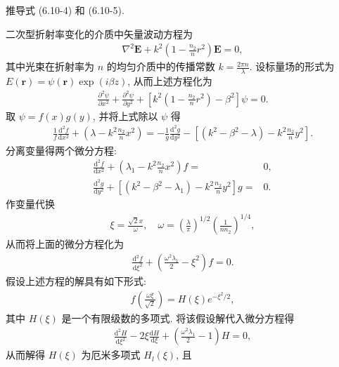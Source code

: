 \documentclass{note}
\begin{document}
\begin{exe}
    推导式 (6.10-4) 和 (6.10-5).
\end{exe}
\begin{pf}
    二次型折射率变化的介质中矢量波动方程为
    \begin{align}
        \nabla^2\bm{E}+k^2\left(1-\frac{n_2}{n}r^2\right)\bm{E}=0,
    \end{align}
    其中光束在折射率为 $n$ 的均匀介质中的传播常数 $k=\frac{2\pi n}{\lambda}$.
    设标量场的形式为 $E(\bm{r})=\psi(\bm{r})\exp(i\beta z)$, 从而上述方程化为
    \begin{align}
        \frac{\partial^2\psi}{\partial x^2}+\frac{\partial^2\psi}{\partial y^2}+\left[k^2\left(1-\frac{n_2}{n}r^2\right)-\beta^2\right]\psi=0.
    \end{align}
    取 $\psi=f(x)g(y)$, 并将上式除以 $\psi$ 得
    \begin{align}
        \frac{1}{f}\frac{\mathrm{d}^2f}{\mathrm{d}x^2}+\left(\lambda-k^2\frac{n_2}{n}x^2\right)=-\frac{1}{g}\frac{\mathrm{d}^2g}{\mathrm{d}y^2}-\left[(k^2-\beta^2-\lambda)-k^2\frac{n_2}{n}y^2\right].
    \end{align}
    分离变量得两个微分方程:
    \begin{align}
        \frac{\mathrm{d}^2f}{\mathrm{d}x^2}+\left(\lambda_1-k^2\frac{n_2}{n}x^2\right)f=&0,\\
        \frac{\mathrm{d}^2g}{\mathrm{d}y^2}+\left[(k^2-\beta^2-\lambda_1)-k^2\frac{n_2}{n}y^2\right]g=&0.
    \end{align}
    作变量代换
    \begin{align}
        \xi=\frac{\sqrt{2}x}{\omega},\quad\omega=\left(\frac{\lambda}{\pi}\right)^{1/2}\left(\frac{1}{nn_2}\right)^{1/4},
    \end{align}
    从而将上面的微分方程化为
    \begin{align}
        \frac{\mathrm{d}^2f}{\mathrm{d}\xi^2}+\left(\frac{\omega^2\lambda_1}{2}-\xi^2\right)f=0.
    \end{align}
    假设上述方程的解具有如下形式:
    \begin{align}
        f\left(\frac{\omega\xi}{\sqrt{2}}\right)=H(\xi)e^{-\xi^2/2},
    \end{align}
    其中 $H(\xi)$ 是一个有限级数的多项式.
    将该假设解代入微分方程得
    \begin{align}
        \frac{\mathrm{d}^2H}{\mathrm{d}\xi^2}-2\xi\frac{\mathrm{d}H}{\mathrm{d}\xi}+\left(\frac{\omega^2\lambda_1}{2}-1\right)H=0,
    \end{align}
    从而解得 $H(\xi)$ 为厄米多项式 $H_l(\xi)$, 且

\end{pf}
\end{document}
